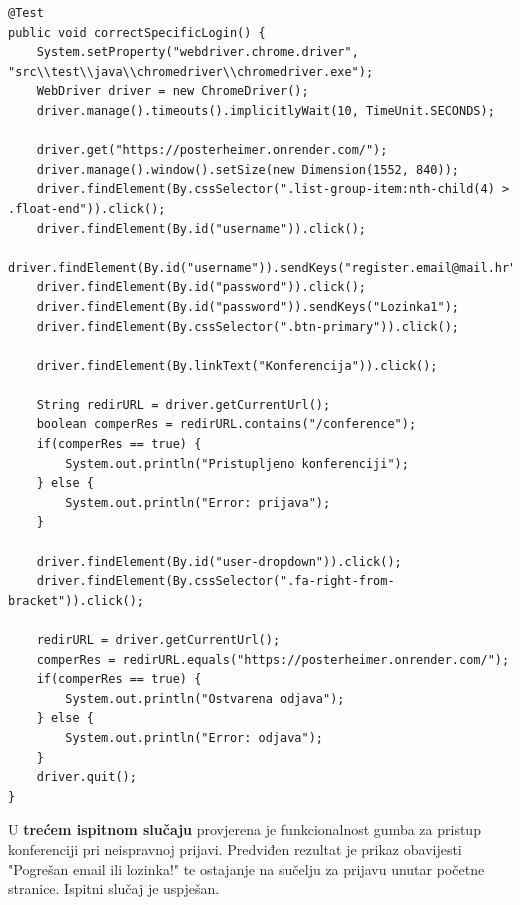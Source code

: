 			
			\begin{lstlisting}
@Test
public void correctSpecificLogin() {
	System.setProperty("webdriver.chrome.driver", "src\\test\\java\\chromedriver\\chromedriver.exe");
	WebDriver driver = new ChromeDriver();
	driver.manage().timeouts().implicitlyWait(10, TimeUnit.SECONDS);
	
	driver.get("https://posterheimer.onrender.com/");
	driver.manage().window().setSize(new Dimension(1552, 840));
	driver.findElement(By.cssSelector(".list-group-item:nth-child(4) > .float-end")).click();
	driver.findElement(By.id("username")).click();
	driver.findElement(By.id("username")).sendKeys("register.email@mail.hr");
	driver.findElement(By.id("password")).click();
	driver.findElement(By.id("password")).sendKeys("Lozinka1");
	driver.findElement(By.cssSelector(".btn-primary")).click();
	
	driver.findElement(By.linkText("Konferencija")).click();
	
	String redirURL = driver.getCurrentUrl();
	boolean comperRes = redirURL.contains("/conference");
	if(comperRes == true) {
		System.out.println("Pristupljeno konferenciji");
	} else {
		System.out.println("Error: prijava");
	}
	
	driver.findElement(By.id("user-dropdown")).click();
	driver.findElement(By.cssSelector(".fa-right-from-bracket")).click();
	
	redirURL = driver.getCurrentUrl();
	comperRes = redirURL.equals("https://posterheimer.onrender.com/");
	if(comperRes == true) {
		System.out.println("Ostvarena odjava");
	} else {
		System.out.println("Error: odjava");
	}
	driver.quit();
}	
			\end{lstlisting}
			
			
			U \textbf{trećem ispitnom slučaju} provjerena je funkcionalnost gumba za pristup konferenciji pri neispravnoj prijavi. Predviđen rezultat je prikaz obavijesti "Pogrešan email ili lozinka!" te ostajanje na sučelju za prijavu unutar početne stranice. Ispitni slučaj je uspješan.
			
